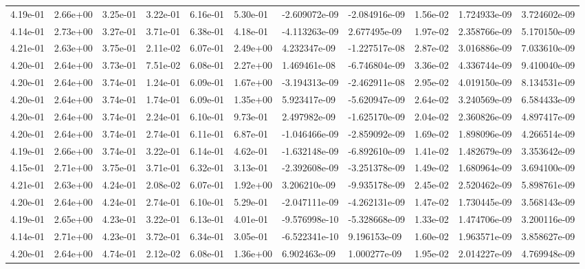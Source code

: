 \begin{longtable}{| p{} | p{} |}
4.19e-01 & 2.66e+00 & 3.25e-01 & 3.22e-01 & 6.16e-01 & 5.30e-01 & -2.609072e-09 & -2.084916e-09 &  1.56e-02 &  1.724933e-09 &  3.724602e-09 \\
4.14e-01 & 2.73e+00 & 3.27e-01 & 3.71e-01 & 6.38e-01 & 4.18e-01 & -4.113263e-09 &  2.677495e-09 &  1.97e-02 &  2.358766e-09 &  5.170150e-09 \\
4.21e-01 & 2.63e+00 & 3.75e-01 & 2.11e-02 & 6.07e-01 & 2.49e+00 &  4.232347e-09 & -1.227517e-08 &  2.87e-02 &  3.016886e-09 &  7.033610e-09 \\
4.20e-01 & 2.64e+00 & 3.73e-01 & 7.51e-02 & 6.08e-01 & 2.27e+00 &  1.469461e-08 & -6.746804e-09 &  3.36e-02 &  4.336744e-09 &  9.410040e-09 \\
4.20e-01 & 2.64e+00 & 3.74e-01 & 1.24e-01 & 6.09e-01 & 1.67e+00 & -3.194313e-09 & -2.462911e-08 &  2.95e-02 &  4.019150e-09 &  8.134531e-09 \\
4.20e-01 & 2.64e+00 & 3.74e-01 & 1.74e-01 & 6.09e-01 & 1.35e+00 &  5.923417e-09 & -5.620947e-09 &  2.64e-02 &  3.240569e-09 &  6.584433e-09 \\
4.20e-01 & 2.64e+00 & 3.74e-01 & 2.24e-01 & 6.10e-01 & 9.73e-01 &  2.497982e-09 & -1.625170e-09 &  2.04e-02 &  2.360826e-09 &  4.897417e-09 \\
4.20e-01 & 2.64e+00 & 3.74e-01 & 2.74e-01 & 6.11e-01 & 6.87e-01 & -1.046466e-09 & -2.859092e-09 &  1.69e-02 &  1.898096e-09 &  4.266514e-09 \\
4.19e-01 & 2.66e+00 & 3.74e-01 & 3.22e-01 & 6.14e-01 & 4.62e-01 & -1.632148e-09 & -6.892610e-09 &  1.41e-02 &  1.482679e-09 &  3.353642e-09 \\
4.15e-01 & 2.71e+00 & 3.75e-01 & 3.71e-01 & 6.32e-01 & 3.13e-01 & -2.392608e-09 & -3.251378e-09 &  1.49e-02 &  1.680964e-09 &  3.694100e-09 \\
4.21e-01 & 2.63e+00 & 4.24e-01 & 2.08e-02 & 6.07e-01 & 1.92e+00 &  3.206210e-09 & -9.935178e-09 &  2.45e-02 &  2.520462e-09 &  5.898761e-09 \\
4.20e-01 & 2.64e+00 & 4.24e-01 & 2.74e-01 & 6.10e-01 & 5.29e-01 & -2.047111e-09 & -4.262131e-09 &  1.47e-02 &  1.730445e-09 &  3.568143e-09 \\
4.19e-01 & 2.65e+00 & 4.23e-01 & 3.22e-01 & 6.13e-01 & 4.01e-01 & -9.576998e-10 & -5.328668e-09 &  1.33e-02 &  1.474706e-09 &  3.200116e-09 \\
4.14e-01 & 2.71e+00 & 4.23e-01 & 3.72e-01 & 6.34e-01 & 3.05e-01 & -6.522341e-10 &  9.196153e-09 &  1.60e-02 &  1.963571e-09 &  3.858627e-09 \\
4.20e-01 & 2.64e+00 & 4.74e-01 & 2.12e-02 & 6.08e-01 & 1.36e+00 &  6.902463e-09 &  1.000277e-09 &  1.95e-02 &  2.014227e-09 &  4.769948e-09 \\

\end{longtable}
